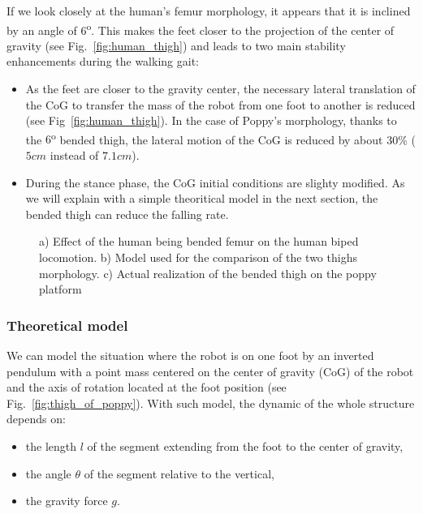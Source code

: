 If we look closely at the human's femur morphology, it appears that it is inclined by an angle of 6\textsuperscript{o}. This makes the feet closer to the projection of the center of gravity (see Fig.~\ref{fig:human_thigh}) and leads to two main stability enhancements during the walking gait:

\begin{itemize}
    \item As the feet are closer to the gravity center, the necessary lateral translation of the CoG to transfer the mass of the robot from one foot to another is reduced (see Fig~\ref{fig:human_thigh}). In the case of Poppy's morphology, thanks to the $6$\textsuperscript{o} bended thigh, the lateral motion of the CoG is reduced by about 30\% ($ 5 cm$ instead of $7.1 cm$).
    \item During the stance phase, the CoG initial conditions are slighty modified. As we will explain with a simple theoritical model in the next section, the bended thigh can reduce the falling rate.
\end{itemize}


\begin{figure}
\centering
    \hfil
    \hfil
    \caption{ a) Effect of the human being bended femur on the human biped locomotion.
    b) Model used for the comparison of the two thighs morphology.
    c) Actual realization of the bended thigh on the poppy platform}
    \label{fig:poppy_thigh}
\end{figure}

\subsubsection{Theoretical model} %
\label{sub:exp_theoritical_model}

We can model the situation where the robot is on one foot by an inverted pendulum with a point mass centered on the center of gravity (CoG) of the robot and the axis of rotation located at the foot position (see Fig.~\ref{fig:thigh_of_poppy}). With such model, the dynamic of the whole structure depends on:

\begin{itemize}
    \item the length $l$ of the segment extending from the foot to the center of gravity,
    \item the angle $\theta$ of the segment relative to the vertical,
    \item the gravity force $g$.
\end{itemize}


